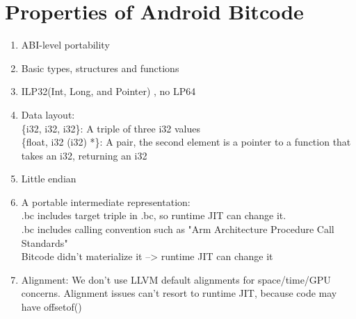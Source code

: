 \section{Properties of Android Bitcode}

\begin{enumerate}
	\item ABI-level portability
	\item Basic types, structures and functions
    \item ILP32(Int, Long, and Pointer) , no LP64
    \item Data layout: \\
          \{i32, i32, i32\}: A triple of three i32 values\\
          \{float, i32 (i32) *\}: A pair, the second element is a pointer to a function that takes an i32, returning an i32
    \item Little endian
    \item A portable intermediate representation: \\
          .bc includes target triple in .bc, so runtime JIT can change it.\\
          .bc includes calling convention such as "Arm Architecture Procedure Call Standards"\\
          Bitcode didn't materialize it --> runtime JIT can change it
    \item Alignment: We don't use LLVM default alignments for space/time/GPU concerns. Alignment issues can't resort to runtime JIT, because code may have offsetof()
\end{enumerate}
